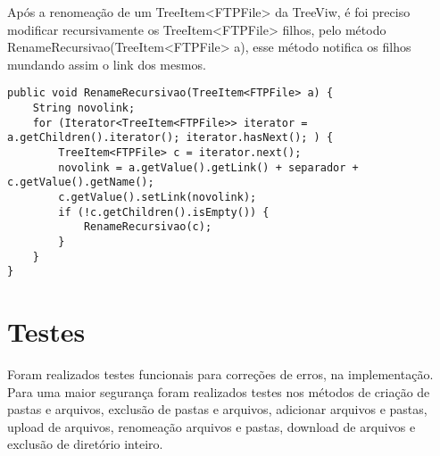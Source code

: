 \documentclass[12pt]{article}
\begin{document}
	Após a renomeação de um TreeItem<FTPFile> da TreeViw, é foi preciso modificar recursivamente os TreeItem<FTPFile> filhos, pelo método RenameRecursivao(TreeItem<FTPFile> a), esse método notifica os filhos mundando assim o link dos mesmos.
\begin{lstlisting}
public void RenameRecursivao(TreeItem<FTPFile> a) {
	String novolink;
	for (Iterator<TreeItem<FTPFile>> iterator = a.getChildren().iterator(); iterator.hasNext(); ) {
		TreeItem<FTPFile> c = iterator.next();
		novolink = a.getValue().getLink() + separador + c.getValue().getName();
		c.getValue().setLink(novolink);
		if (!c.getChildren().isEmpty()) {
			RenameRecursivao(c);
		}
	}
}
\end{lstlisting}

\section{Testes}
Foram realizados testes funcionais para correções de erros, na implementação. Para uma maior segurança foram realizados testes nos métodos de criação de pastas e arquivos, exclusão de pastas e arquivos, adicionar arquivos e pastas, upload de arquivos, renomeação arquivos e pastas, download de arquivos e exclusão de diretório inteiro.

 
\end{document}
